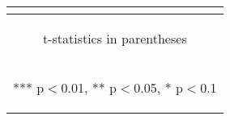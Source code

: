 \documentclass[border=0.2cm]{standalone}
\begin{document}
\begin{tabular}{lcccccc}
    \vspace{2pt}           & \begin{footnotesize}\end{footnotesize}         & \begin{footnotesize}\end{footnotesize}         & \begin{footnotesize}\end{footnotesize}         & \begin{footnotesize}\end{footnotesize}         & \begin{footnotesize}\end{footnotesize}         & \begin{footnotesize}\end{footnotesize}         \\
    \bottomrule
    \multicolumn{7}{c}{\begin{footnotesize} t-statistics in parentheses\end{footnotesize}}                                                                                                                                                                                                                                       \\
    \multicolumn{7}{c}{\begin{footnotesize} *** p$<$0.01, ** p$<$0.05, * p$<$0.1\end{footnotesize}}                                                                                                                                                                                                                              \\
\end{tabular}
\end{document}
